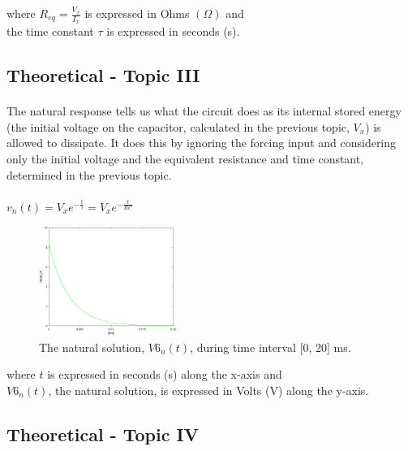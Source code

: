  where $ R_{eq} = \frac{V_x}{I_x} $ is expressed in Ohms $(\Omega)$ and \\
 the time constant $\tau$ is expressed in seconds (s). 
 
\subsection{Theoretical - Topic III}
\label{subsec:third_topic}

\paragraph{}
The natural response tells us what the circuit does as its internal stored energy (the initial voltage on the capacitor, calculated in the previous topic, $V_x$) is allowed to dissipate. It does this by ignoring the forcing input and considering only the initial voltage and the equivalent resistance and time constant, determined in the previous topic.

\paragraph{}
$ v_n(t)=V_x e^{-\frac{t}{\tau}}=V_x e^{-\frac{t}{RC}} $

\begin{figure}[H] \centering
\includegraphics[width=0.4\textwidth]{natural.eps}
\caption{The natural solution, $V6_n(t)$, during time interval [0, 20] ms.}
\label{fig:theo_third}
\end{figure}

where $t$ is expressed in seconds (s) along the x-axis and \\
$V6_n(t)$, the natural solution, is expressed in Volts (V) along the y-axis.


 
\subsection{Theoretical - Topic IV}
\label{subsec:fourth_topic}

